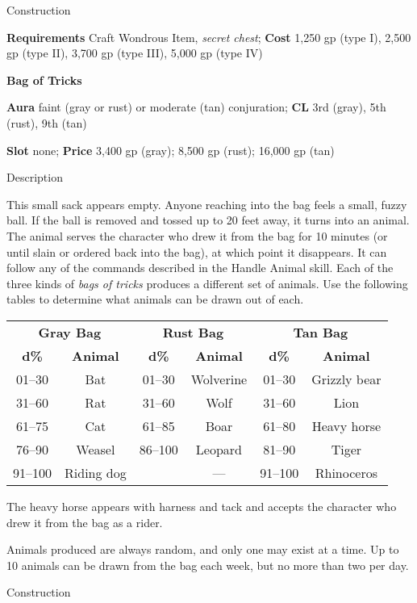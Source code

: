 Construction
				
\textbf{Requirements} Craft Wondrous Item, \textit{secret chest}; \textbf{Cost }1,250 gp (type I), 2,500 gp (type II), 3,700 gp (type III), 5,000 gp (type IV)
				
\textbf{Bag of Tricks}
				
\textbf{Aura} faint (gray or rust) or moderate (tan) conjuration; \textbf{CL} 3rd (gray), 5th (rust), 9th (tan)
				
\textbf{Slot} none; \textbf{Price} 3,400 gp (gray); 8,500 gp (rust); 16,000 gp (tan)
				
Description
				
This small sack appears empty. Anyone reaching into the bag feels a small, fuzzy ball. If the ball is removed and tossed up to 20 feet away, it turns into an animal. The animal serves the character who drew it from the bag for 10 minutes (or until slain or ordered back into the bag), at which point it disappears. It can follow any of the commands described in the Handle Animal skill. Each of the three kinds of \textit{bags of tricks }produces a different set of animals. Use the following tables to determine what animals can be drawn out of each.
				
\setlength{\tabcolsep}{1pt}
\begin{tabular}{cccccc}
\multicolumn{2}{c}{\textbf{Gray Bag}} & \multicolumn{2}{c}{\textbf{Rust Bag}} & \multicolumn{2}{c}{\textbf{Tan Bag}}\\
\textbf{d\%} & \textbf{Animal} & \textbf{d\%} & \textbf{Animal} & \textbf{d\%} & \textbf{Animal}\\
 01--30 & Bat & 01--30 & Wolverine & 01--30 & Grizzly bear\\
 31--60 & Rat & 31--60 & Wolf & 31--60 & Lion\\
 61--75 & Cat & 61--85 & Boar & 61--80 & Heavy horse\\
 76--90 & Weasel & 86--100 & Leopard & 81--90 & Tiger\\
 91--100 & Riding dog & & --- & 91--100 & Rhinoceros\\
\end{tabular}
				
The heavy horse appears with harness and tack and accepts the character who drew it from the bag as a rider.
				
Animals produced are always random, and only one may exist at a time. Up to 10 animals can be drawn from the bag each week, but no more than two per day.
				
Construction
				
